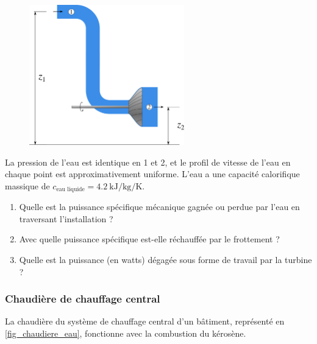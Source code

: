 	\begin{figure}
		\begin{center}
			\includegraphics[width=0.6\textwidth]{images/turbine_eau.png}
		\end{center}
		\label{fig_turbine_hydraulique_exo}
	\end{figure}
	
	La pression de l’eau est identique en 1 et 2, et le profil de vitesse de l’eau en chaque point est approximativement uniforme. L’eau a une capacité calorifique massique de $c_{\text{eau liquide}} = \SI{4,2}{\kilo\joule\per\kilogram\per\kelvin}$.
	
	\begin{enumerate}
		\item Quelle est la puissance spécifique mécanique gagnée ou perdue par l’eau en traversant l’installation ?
		\item Avec quelle puissance spécifique est-elle réchauffée par le frottement ?
		\item Quelle est la puissance (en \si{watts}) dégagée sous forme de travail par la turbine ?
	\end{enumerate}


\subsubsection{Chaudière de chauffage central}
\label{exo_chaudiere_simple}

	La chaudière du système de chauffage central d’un bâtiment, représenté en \cref{fig_chaudiere_eau}, fonctionne avec la combustion du kérosène.
	
